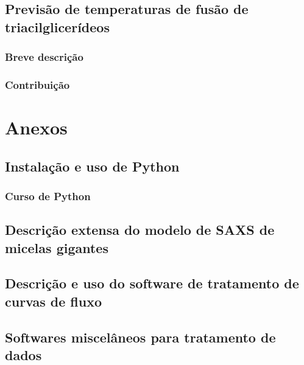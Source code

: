 \documentclass[a4paper, 10pt]{book}
\begin{document}
	\chapter{Previsão de temperaturas de fusão de triacilglicerídeos}
		\section{Breve descrição}
		\section{Contribuição}

\part{Anexos}
	\chapter{Instalação e uso de Python}
		\section{Curso de Python}
	\chapter{Descrição extensa do modelo de SAXS de micelas gigantes}
	\chapter{Descrição e uso do software de tratamento de curvas de fluxo}
	\chapter{Softwares miscelâneos para tratamento de dados}
	
\end{document}
